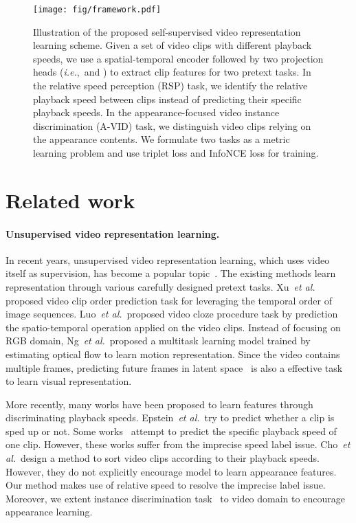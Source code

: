 \documentclass[final]{cvpr}
\def\etal{{\em et al.\/}\, }
\def\ie{\mbox{\textit{i.e.}, }}
\begin{document}
\begin{figure*}[t]
	\centering
	\texttt{[image: fig/framework.pdf]}
	\caption{Illustration of the proposed self-supervised video representation learning scheme. Given a set of video clips with different playback speeds, we use a spatial-temporal encoder  followed by two projection heads (\ie  and ) to extract clip features for two pretext tasks. In the relative speed perception (RSP) task, we identify the relative playback speed between clips instead of predicting their specific playback speeds. In the appearance-focused video instance discrimination (A-VID) task, we distinguish video clips relying on the appearance contents.
	We formulate two tasks as a metric learning problem and use triplet loss  and InfoNCE loss  for training.}
	\label{fig:framework}
	\vspace{-0mm}
\end{figure*}	

	\vspace{-5mm}
	\section{Related work}
\paragraph{Unsupervised video representation learning.}
	In recent years, unsupervised video representation learning, which uses video itself as supervision, has become a popular topic~\cite{jing2020self}. 
	The existing methods learn representation through various carefully designed pretext tasks. Xu~\etal\cite{xu2019self} proposed video clip order prediction task for leveraging the temporal order of image sequences. Luo~\etal\cite{vcp} proposed video cloze procedure task by prediction the spatio-temporal operation applied on the video clips. Instead of focusing on RGB domain, Ng~\etal\cite{ng2018actionflownet} proposed a multitask learning model trained by estimating optical flow to learn motion representation. Since the video contains multiple frames, predicting future frames in latent space~\cite{oord2018representation} is also a effective task to learn visual representation.
	
	
	More recently, many works have been proposed to learn features through discriminating playback speeds. Epstein~\etal\cite{oops} try to predict whether a clip is sped up or not. Some works~\cite{pace,PRP} attempt to predict the specific playback speed of one clip. However, these works suffer from the imprecise speed label issue. Cho~\etal\cite{playbackspeed} design a method to sort video clips according to their playback speeds. However, they do not explicitly encourage model to learn appearance features. Our method makes use of relative speed to resolve the imprecise label issue. Moreover, we extent instance discrimination task~\cite{wu2018unsupervised} to video domain to encourage appearance learning.
\end{document}
